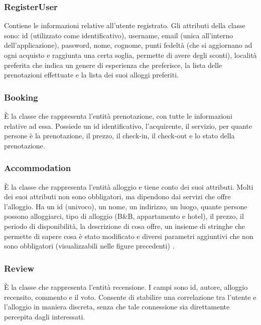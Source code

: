 \documentclass[10pt]{article}
\begin{document}
\subsubsection{RegisterUser}

Contiene le informazioni relative all'utente registrato. Gli attributi della classe sono: id (utilizzato come identificativo), username, email (unica all'interno dell'applicazione), password, nome, cognome, punti fedeltà (che si aggiornano ad ogni acquisto e raggiunta una certa soglia, permette di avere degli sconti), località preferita che indica un genere di esperienza che preferisce, la lista delle prenotazioni effettuate e la lista dei suoi alloggi preferiti. 

\subsubsection{Booking}

\`E la classe che rappresenta l'entità prenotazione, con tutte le informazioni relative ad essa. Possiede un id identificativo, l'acquirente, il servizio, per quante persone è la prenotazione, il prezzo, il check-in, il check-out e lo stato della prenotazione.

\subsubsection{Accommodation}

\`E la classe che rappresenta l'entità alloggio e tiene conto dei suoi attributi. Molti dei suoi attributi non sono obbligatori, ma dipendono dai servizi che offre l'alloggio. Ha un id (univoco), un nome, un indirizzo, un luogo, quante persone possono alloggiarci, tipo di alloggio (B\&B, appartamento e hotel), il prezzo, il periodo di disponibilità, la descrizione di cosa offre, un insieme di stringhe che permette di sapere cosa è stato modificato e diversi parametri aggiuntivi che non sono obbligatori (visualizzabili nelle figure precedenti) .

\subsubsection{Review}

\`E la classe che rappresenta l'entità recensione. I campi sono id, autore, alloggio recensito, commento e il voto. Consente di stabilire una correlazione tra l'utente e l'alloggio in maniera discreta, senza che tale connessione sia direttamente percepita dagli interessati.
\end{document}
